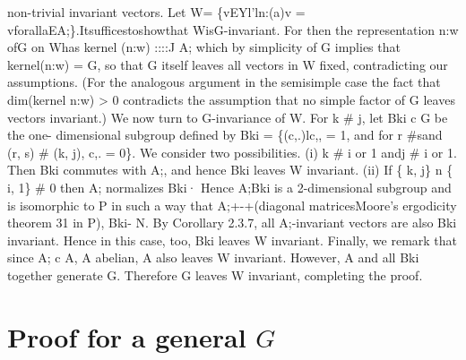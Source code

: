 \documentclass[
  12pt
]{article}
\theoremstyle{break}
\theoremstyle{plain}
\begin{document}
  non-trivial invariant vectors. Let W= \{vEYl'ln:(a)v =
  vforallaEA;\}.Itsufficestoshowthat WisG-invariant. For then the
  representation n:w ofG on Whas kernel (n:w) ::::J A; which by simplicity
  of G implies that kernel(n:w) = G, so that G itself leaves all vectors
  in W fixed, contradicting our assumptions. (For the analogous argument
  in the semisimple case the fact that dim(kernel n:w) \textgreater{} 0
  contradicts the assumption that no simple factor of G leaves vectors
  invariant.) We now turn to G-invariance of W. For k \# j, let Bki c G be
  the one- dimensional subgroup defined by Bki = \{(c,.)lc,, = 1, and for
  r \#sand (r, s) \# (k, j), c,. = 0\}. We consider two possibilities. (i)
  k \# i or 1 andj \# i or 1. Then Bki commutes with A;, and hence Bki
  leaves W invariant. (ii) If \{ k, j\} n \{ i, 1\} \# 0 then A;
  normalizes Bki· Hence A;Bki is a 2-dimensional subgroup and is
  isomorphic to P in such a way that A;+-+(diagonal matricesMoore's
  ergodicity theorem 31 in P), Bki- N. By Corollary 2.3.7, all
  A;-invariant vectors are also Bki invariant. Hence in this case, too,
  Bki leaves W invariant. Finally, we remark that since A; c A, A abelian,
  A also leaves W invariant. However, A and all Bki together generate G.
  Therefore G leaves W invariant, completing the proof.









\hypertarget{proof-for-a-general-G}{%
\section{Proof for a general \texorpdfstring{$G$}{G}}\label{proof-for-a-general-G}}
\end{document}
